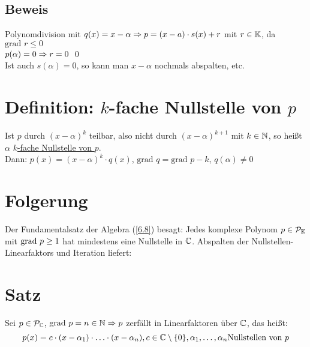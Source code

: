 \fancyhead[R]{}
\subsection*{Beweis}
Polynomdivision mit $q(x)=x-\alpha \Rightarrow p=(x-a) \cdot s(x) + r$ mit $r \in \mathbb{K}$, da $\text{grad } r \le 0$\\
$p(\alpha)=0 \Rightarrow r=0$ \qed\\
Ist auch $s(\alpha)=0$, so kann man $x-\alpha$ nochmals abspalten, etc.

\section{\texorpdfstring{Definition: $k$-fache Nullstelle von $p$}{Definition: k-fache Nullstelle von p}}\label{6.12}
Ist $p$ durch $(x-\alpha)^k$ teilbar, also nicht durch $(x-\alpha)^{k+1}$ mit $k \in \mathbb{N}$, so heißt $\alpha$ \underline{$k$-fache Nullstelle von $p$}.\\
Dann: $p(x)=(x-\alpha)^k \cdot q(x)$, $\text{grad } q = \text{grad } p -k$, $q(\alpha) \neq 0$

\section{Folgerung}\label{6.13}
Der Fundamentalsatz der Algebra (\ref{6.8}) besagt: Jedes komplexe Polynom $p \in \mathcal{P}_{\mathbb{K}}$ mit $\text{grad } p \ge 1$ hat mindestens eine Nullstelle in $\mathbb{C}$.\nl
Abspalten der Nullstellen-Linearfaktors und Iteration liefert:

\section{Satz}\label{6.14}
Sei $p \in \mathcal{P}_{\mathbb{C}}$, $\text{grad } p = n \in \mathbb{N} \Rightarrow p$ zerfällt in Linearfaktoren über $\mathbb{C}$, das heißt:
$$p(x)=c \cdot (x-\alpha_1) \cdot \ldots \cdot (x-\alpha_n), c \in \mathbb{C} \setminus \{0\}, \alpha_1, \ldots, \alpha_n \text{Nullstellen von } p$$


